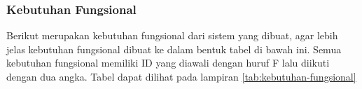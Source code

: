 \subsubsection{Kebutuhan Fungsional}
Berikut merupakan kebutuhan fungsional dari sistem yang dibuat, agar lebih jelas kebutuhan fungsional dibuat ke dalam bentuk tabel di bawah ini. Semua kebutuhan fungsional memiliki ID yang diawali dengan huruf F lalu diikuti dengan dua angka. Tabel dapat dilihat pada lampiran \ref{tab:kebutuhan-fungsional}

